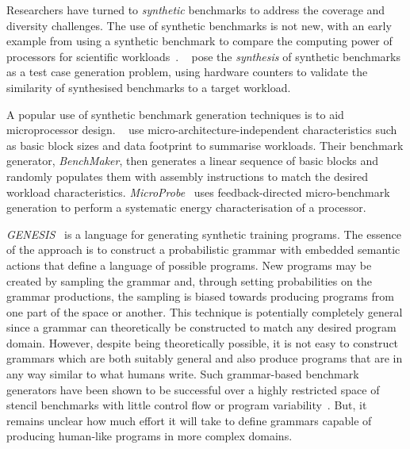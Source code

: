 Researchers have turned to \emph{synthetic} benchmarks to address the coverage and diversity challenges.
The use of synthetic benchmarks is not new, with an early example from \citeyear{Curnow1976} using a synthetic benchmark to compare the computing power of processors for scientific workloads~\cite{Curnow1976}.
\citeauthor{Bell2005}~\cite{Bell2005} pose the \emph{synthesis} of synthetic benchmarks as a test case generation problem, using hardware counters to validate the similarity of synthesised benchmarks to a target workload.

A popular use of synthetic benchmark generation techniques is to aid microprocessor design. \citeauthor{Joshi2008}~\cite{Joshi2008} use micro-architecture-independent characteristics such as basic block sizes and data footprint to summarise workloads. Their benchmark generator, \emph{BenchMaker}, then generates a linear sequence of basic blocks and randomly populates them with assembly instructions to match the desired workload characteristics.
\emph{MicroProbe}~\cite{Bertran2012} uses feedback-directed micro-benchmark generation to perform a systematic energy characterisation of a processor.

\emph{GENESIS}~\cite{Chiu2015} is a language for generating synthetic training programs. The essence of the approach is to construct a probabilistic grammar with embedded semantic actions that define a language of possible programs. New programs may be created by sampling the grammar and, through setting probabilities on the grammar productions, the sampling is biased towards producing programs from one part of the space or another. This technique is potentially completely general since a grammar can theoretically be constructed to match any desired program domain. However, despite being theoretically possible, it is not easy to construct grammars which are both suitably general and also produce programs that are in any way similar to what humans write. Such grammar-based benchmark generators have been shown to be successful over a highly restricted space of stencil benchmarks with little control flow or program variability~\cite{Garvey2015b,Falch2015,Cummins2016a}. But, it remains unclear how much effort it will take to define grammars capable of producing human-like programs in more complex domains.

